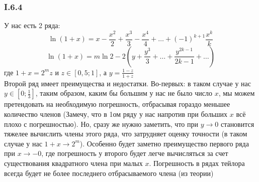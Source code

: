 \subsubsection*{I.6.4}
У нас есть 2 ряда:
$$\ln (1+x) = x - \frac{x^2}{2} + \frac{x^3}{3} - \frac{x^4}{4} + \dots + (-1)^{k+1} \frac{x^k}{k}$$
$$\ln (1+x) = m\ln 2 - 2 \left( y + \frac{y^3}{3} + \dots +  \frac{y^{2k-1}}{2k - 1} + \dots \right)$$
где $1 + x = 2^m z$ и $z \in \left[0,5; 1\right]$, а $y = \frac{1 - z}{1 + z}$\\
Второй ряд имеет преимущества и недостатки. Во-первых: в таком случае у нас $y \in \left[0; \frac{1}{3}\right]$, таким образом, каким бы большим у нас не было число $x$, мы можем претендовать на необходимую погрешность, отбрасывая гораздо меньшее количество членов (Замечу, что в 1ом ряду у нас напротив при больших $x$ всё плохо с погрешностью). Но, сразу же нужно заметить, что при $y \rightarrow 0$ становится тяжелее вычислить члены этого ряда, что затрудняет оценку точности (в таком случае у нас $1+x \rightarrow 2^m$). Особенно будет заметно преимущество первого ряда при $x \rightarrow -0$, где погрешность у второго будет легче вычисляться за счет существования квадратного члена при малых $x$. Погрешность в рядах тейлора всегда будет не более последнего отбрасываемого члена (из теории)